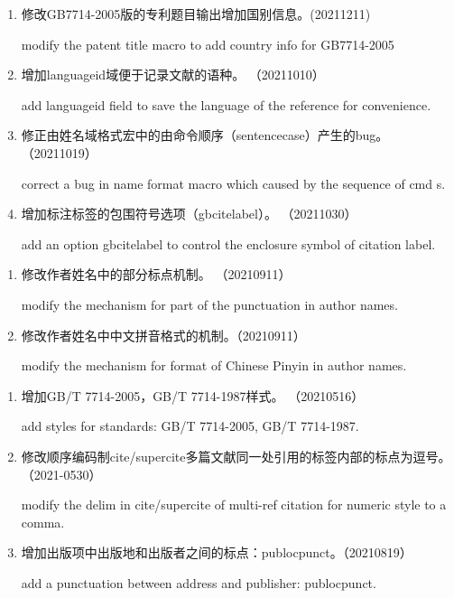 \begin{enumerate}

\item 修改GB7714-2005版的专利题目输出增加国别信息。(20211211)

modify the patent title macro to add country info for GB7714-2005

\item 增加languageid域便于记录文献的语种。 （20211010）

add languageid field to save the language of the reference for convenience.

\item 修正由姓名域格式宏中的由命令顺序（sentencecase）产生的bug。 （20211019）

correct a bug in name format macro which caused by the sequence of cmd
s.

\item 增加标注标签的包围符号选项（gbcitelabel）。 （20211030）

add an option gbcitelabel to control the enclosure symbol of citation label.

\end{enumerate}


\label{up:20210911}

\begin{enumerate}
\item 修改作者姓名中的部分标点机制。 （20210911）

modify the mechanism for part of the punctuation in author names.

\item 修改作者姓名中中文拼音格式的机制。（20210911）

modify the mechanism for format of Chinese Pinyin in author names.

\end{enumerate}



\label{up:20210819}

\begin{enumerate}
\item 增加GB/T 7714-2005，GB/T 7714-1987样式。 （20210516）

add styles for standards: GB/T 7714-2005, GB/T 7714-1987.

\item 修改顺序编码制cite/supercite多篇文献同一处引用的标签内部的标点为逗号。（2021-0530）

modify the delim in cite/supercite of multi-ref citation for numeric style to a comma.

\item 增加出版项中出版地和出版者之间的标点：publocpunct。（20210819）

add a punctuation between address and publisher: publocpunct.


\end{enumerate}


